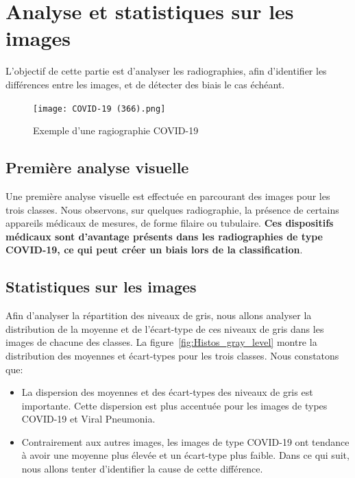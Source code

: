 \documentclass[11pt,twoside,openright]{article}
\begin{document}
\section{Analyse et statistiques sur les images}
L'objectif de cette partie est d'analyser les radiographies, afin d'identifier les différences entre les images, et de détecter des biais le cas échéant.

\begin{figure}[htbp]
\centering
\texttt{[image: COVID-19 (366).png]}
\caption{Exemple d'une ragiographie COVID-19}
\label{fig:Radio_COV}
\end{figure}

\subsection{Première analyse visuelle}

Une première analyse visuelle est effectuée en parcourant des images pour les trois classes. Nous observons, sur quelques radiographie, la présence de certains appareils médicaux de mesures, de forme filaire ou tubulaire. \textbf{Ces dispositifs médicaux sont d'avantage présents dans les radiographies de type COVID-19, ce qui peut créer un biais lors de la classification}.  


\subsection{Statistiques sur les images}

Afin d'analyser la répartition des niveaux de gris, nous allons analyser la distribution de la moyenne et de l'écart-type de ces niveaux de gris dans les images de chacune des classes. La figure~\ref{fig:Histos_gray_level} montre la distribution des moyennes et écart-types pour les trois classes. Nous constatons que:
\begin{itemize}
\item La dispersion des moyennes et des écart-types des niveaux de gris est importante. Cette dispersion est plus accentuée pour les images de types COVID-19 et Viral Pneumonia.
\item Contrairement aux autres images, les images de type COVID-19 ont tendance à avoir une moyenne plus élevée et un écart-type plus faible. Dans ce qui suit, nous allons tenter d'identifier la cause de cette différence.
 \end{itemize}
\end{document}
